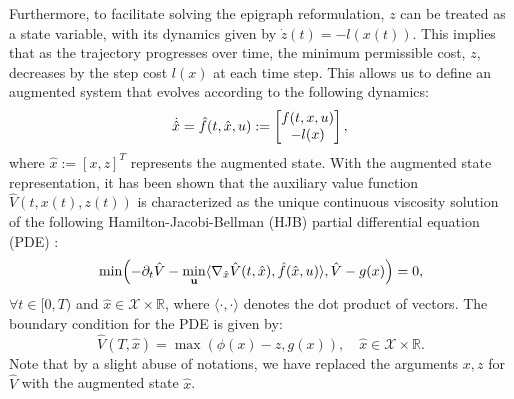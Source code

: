 Furthermore, to facilitate solving the epigraph reformulation, $z$ can be treated as a state variable, with its dynamics given by $\dot{z}(t) = -l(x(t))$. This implies that as the trajectory progresses over time, the minimum permissible cost, $z$, decreases by the step cost $l(x)$ at each time step. This allows us to define an augmented system that evolves according to the following dynamics:
\begin{equation}
    \dot{\hat{x}} = \hat{f}(t, \hat{x}, u) := 
    \begin{bmatrix}
        f(t, x, u) \\
        -l(x)
    \end{bmatrix}, \\ 
\end{equation}
where $\hat{x} := [x, z]^T$ represents the augmented state.
With the augmented state representation, it has been shown that the auxiliary value function $\hat{V}(t, x(t), z(t))$ is characterized as the unique continuous viscosity solution of the following Hamilton-Jacobi-Bellman (HJB) partial differential equation (PDE) \cite{altarovici2013general}:
\begin{equation}\label{eq: coopt_pde}
\min\Bigl(-\partial_t \hat{V} - \min_{\mathbf{u}} \langle \nabla_{\hat{x}}\hat{V}(t, \hat{x}), \hat{f}(\hat{x}, u)\rangle ,\hat{V} - g(x)\Bigr) = 0,
\end{equation}
$\forall t \in [0,T)$ and $\hat{x} \in \mathcal{X} \times \mathbb{R}$, where $\langle \cdot, \cdot \rangle$ denotes the dot product of vectors. The boundary condition for the PDE is given by:
\begin{equation}\label{eq: terminal_condition}
\hat{V}(T,\hat{x}) = \max\left(\phi(x) - z, g(x)\right), \quad \hat{x} \in \mathcal{X} \times \mathbb{R}.
\end{equation}
Note that by a slight abuse of notations, we have replaced the arguments $x,z$ for $\hat{V}$ with the augmented state $\hat{x}$.



